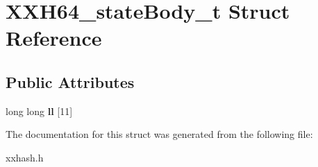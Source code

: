 \hypertarget{structXXH64__stateBody__t}{}\section{X\+X\+H64\+\_\+state\+Body\+\_\+t Struct Reference}
\label{structXXH64__stateBody__t}
\subsection*{Public Attributes}
\begin{DoxyCompactItemize}
\item 
\hypertarget{structXXH64__stateBody__t_afe304ad545134e214cfbc9ae4a32693f}{}long long {\bfseries ll} \mbox{[}11\mbox{]}\label{structXXH64__stateBody__t_afe304ad545134e214cfbc9ae4a32693f}

\end{DoxyCompactItemize}


The documentation for this struct was generated from the following file\+:\begin{DoxyCompactItemize}
\item 
xxhash.\+h\end{DoxyCompactItemize}
